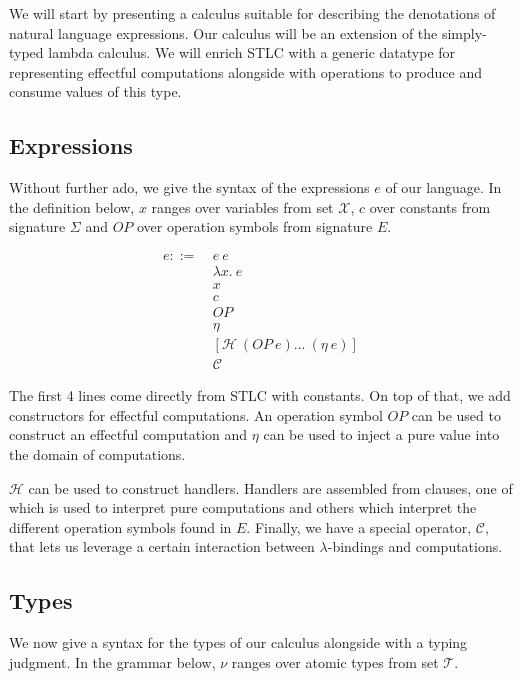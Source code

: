 \documentclass{article}
\begin{document}
We will start by presenting a calculus suitable for describing the
denotations of natural language expressions. Our calculus will be an
extension of the simply-typed lambda calculus. We will enrich STLC with a
generic datatype for representing effectful computations alongside with
operations to produce and consume values of this type.


\subsection{Expressions}

Without further ado, we give the syntax of the expressions $e$ of our
language. In the definition below, $x$ ranges over variables from set
$\mathcal{X}$, $c$ over constants from signature $\Sigma$ and $OP$ over
operation symbols from signature $E$.

\begin{align*}
  e ::= \
  & e\ e \\
  & \lambda x.\ e \\
  & x \\
  & c \\
  & OP \\
  & \eta \\
  & \left[\mathcal{H}\ (OP\ e) \ldots\ (\eta\ e)\right]\\
  & \mathcal{C}
\end{align*}

The first 4 lines come directly from STLC with constants. On top of that,
we add constructors for effectful computations. An operation symbol $OP$
can be used to construct an effectful computation and $\eta$ can be used to
inject a pure value into the domain of computations.

$\mathcal{H}$ can be used to construct handlers. Handlers are assembled
from clauses, one of which is used to interpret pure computations and
others which interpret the different operation symbols found in
$E$. Finally, we have a special operator, $\mathcal{C}$, that lets us
leverage a certain interaction between $\lambda$-bindings and computations.


\subsection{Types}

We now give a syntax for the types of our calculus alongside with a typing
judgment. In the grammar below, $\nu$ ranges over atomic types from set
$\mathcal{T}$.
\end{document}

